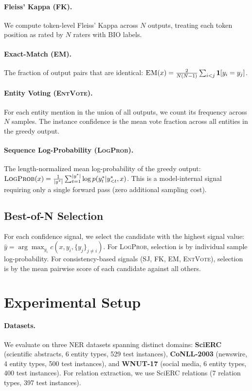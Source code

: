 \documentclass[11pt,a4paper]{article}
\newcommand{\SJ}{\textsc{SJ}}
\newcommand{\FK}{\textsc{FK}}
\newcommand{\LP}{\textsc{LogProb}}
\newcommand{\EM}{\textsc{EM}}
\newcommand{\EV}{\textsc{EntVote}}
\begin{document}
\paragraph{Fleiss' Kappa (\FK{}).}
We compute token-level Fleiss' Kappa across $N$ outputs, treating each token position as rated by $N$ raters with BIO labels.

\paragraph{Exact-Match (\EM{}).}
The fraction of output pairs that are identical: $\EM{}(x) = \frac{2}{N(N{-}1)} \sum_{i<j} \mathbf{1}[y_i = y_j]$.

\paragraph{Entity Voting (\EV{}).}
For each entity mention in the union of all outputs, we count its frequency across $N$ samples.
The instance confidence is the mean vote fraction across all entities in the greedy output.

\paragraph{Sequence Log-Probability (\LP{}).}
The length-normalized mean log-probability of the greedy output: $\LP{}(x) = \frac{1}{|y^*|} \sum_{t=1}^{|y^*|} \log p(y^*_t | y^*_{<t}, x)$.
This is a model-internal signal requiring only a single forward pass (zero additional sampling cost).

\subsection{Best-of-N Selection}

For each confidence signal, we select the candidate with the highest signal value:
$\hat{y} = \arg\max_{y_i} c(x, y_i, \{y_j\}_{j \neq i})$.
For \LP{}, selection is by individual sample log-probability.
For consistency-based signals (\SJ{}, \FK{}, \EM{}, \EV{}), selection is by the mean pairwise score of each candidate against all others.

\section{Experimental Setup}
\label{sec:setup}

\paragraph{Datasets.}
We evaluate on three NER datasets spanning distinct domains:
\textbf{SciERC} \cite{luan2018multi} (scientific abstracts, 6 entity types, 529 test instances),
\textbf{CoNLL-2003} \cite{tjong2003introduction} (newswire, 4 entity types, 500 test instances),
and \textbf{WNUT-17} \cite{derczynski2017results} (social media, 6 entity types, 400 test instances).
For relation extraction, we use SciERC relations (7 relation types, 397 test instances).
\end{document}
